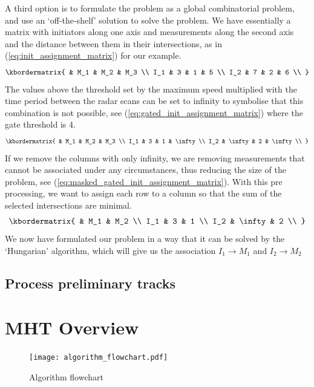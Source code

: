 A third option is to formulate the problem as a global combinatorial problem, and use an `off-the-shelf' solution to solve the problem. We have essentially a matrix with initiators along one axis and measurements along the second axis and the distance between them in their intersections, as in (\ref{eq:init_assignment_matrix}) for our example.
\begin{equation}\label{eq:init_assignment_matrix}
\kbordermatrix{
	 	& M_1 	& M_2 	& M_3	\\
    I_1 & 3 	& 1 	& 5 	\\
    I_2 & 7 	& 2 	& 6		\\
}
\end{equation}
The values above the threshold set by the maximum speed multiplied with the time period between the radar scans can be set to infinity to symbolise that this combination is not possible, see (\ref{eq:gated_init_assignment_matrix}) where the gate threshold is 4.
\begin{equation}\label{eq:gated_init_assignment_matrix}
\kbordermatrix{
	 	& M_1 		& M_2 	& M_3		\\
    I_1 & 3 		& 1 	& \infty 	\\
    I_2 & \infty 	& 2 	& \infty	\\
}
\end{equation}
If we remove the columns with only infinity, we are removing measurements that cannot be associated under any circumstances, thus reducing the size of the problem, see (\ref{eq:masked_gated_init_assignment_matrix}). With this pre processing, we want to assign each row to a column so that the sum of the selected intersections are minimal. 
\begin{equation}\label{eq:masked_gated_init_assignment_matrix}
\kbordermatrix{
	 	& M_1 		& M_2	\\
    I_1 & 3 		& 1  	\\
    I_2 & \infty 	& 2 	\\
}
\end{equation}
We now have formulated our problem in a way that it can be solved by the `Hungarian' algorithm, which will give us the association \(I_1 \rightarrow M_1\) and \(I_2 \rightarrow M_2\)

\subsection{Process preliminary tracks}

\section{MHT Overview}
\begin{figure}[H]
\centering
\texttt{[image: algorithm\_flowchart.pdf]}
\caption{Algorithm flowchart}\label{fig:algorithm_flow}
\end{figure}

